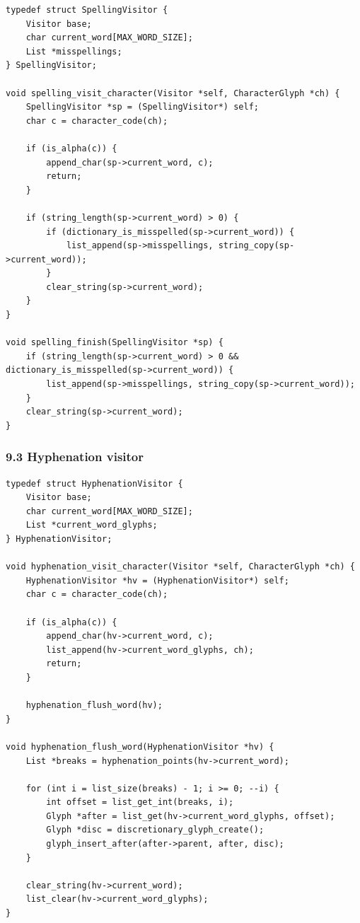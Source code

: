 \documentclass[11pt]{article}
\begin{document}
\begin{verbatim}
typedef struct SpellingVisitor {
    Visitor base;
    char current_word[MAX_WORD_SIZE];
    List *misspellings;
} SpellingVisitor;

void spelling_visit_character(Visitor *self, CharacterGlyph *ch) {
    SpellingVisitor *sp = (SpellingVisitor*) self;
    char c = character_code(ch);

    if (is_alpha(c)) {
        append_char(sp->current_word, c);
        return;
    }

    if (string_length(sp->current_word) > 0) {
        if (dictionary_is_misspelled(sp->current_word)) {
            list_append(sp->misspellings, string_copy(sp->current_word));
        }
        clear_string(sp->current_word);
    }
}

void spelling_finish(SpellingVisitor *sp) {
    if (string_length(sp->current_word) > 0 && dictionary_is_misspelled(sp->current_word)) {
        list_append(sp->misspellings, string_copy(sp->current_word));
    }
    clear_string(sp->current_word);
}
\end{verbatim}

\subsubsection{9.3 Hyphenation visitor}\label{hyphenation-visitor}

\begin{verbatim}
typedef struct HyphenationVisitor {
    Visitor base;
    char current_word[MAX_WORD_SIZE];
    List *current_word_glyphs;
} HyphenationVisitor;

void hyphenation_visit_character(Visitor *self, CharacterGlyph *ch) {
    HyphenationVisitor *hv = (HyphenationVisitor*) self;
    char c = character_code(ch);

    if (is_alpha(c)) {
        append_char(hv->current_word, c);
        list_append(hv->current_word_glyphs, ch);
        return;
    }

    hyphenation_flush_word(hv);
}

void hyphenation_flush_word(HyphenationVisitor *hv) {
    List *breaks = hyphenation_points(hv->current_word);

    for (int i = list_size(breaks) - 1; i >= 0; --i) {
        int offset = list_get_int(breaks, i);
        Glyph *after = list_get(hv->current_word_glyphs, offset);
        Glyph *disc = discretionary_glyph_create();
        glyph_insert_after(after->parent, after, disc);
    }

    clear_string(hv->current_word);
    list_clear(hv->current_word_glyphs);
}
\end{verbatim}
\end{document}
